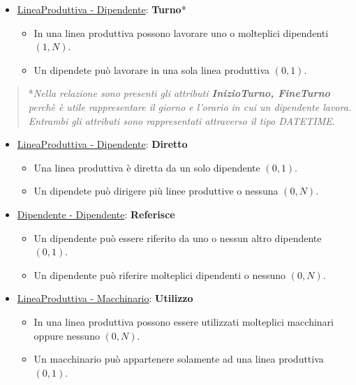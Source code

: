 \begin{itemize}
	\item \underline{LineaProduttiva - Dipendente}: \textbf{Turno}*
	
	\begin{itemize}
		\item In una linea produttiva possono lavorare uno o molteplici dipendenti $(1,N)$.
		\item Un dipendete può lavorare in una sola linea produttiva $(0,1)$.
	\end{itemize}
	
\end{itemize}

\begin{verse}
	*\emph{Nella relazione sono presenti gli attributi \textbf{InizioTurno, FineTurno} perchè è utile rappresentare il giorno e l'orario in cui un dipendente lavora. Entrambi gli attributi sono rappresentati attraverso il tipo DATETIME.}
\end{verse}

\begin{itemize}
	\item \underline{LineaProduttiva - Dipendente}: \textbf{Diretto}
	
	\begin{itemize}
		\item Una linea produttiva è diretta da un solo dipendente $(0,1)$.
		\item Un dipendete può dirigere più linee produttive o nessuna $(0,N)$.
	\end{itemize}
	
\end{itemize}

\begin{itemize}
	\item \underline{Dipendente - Dipendente}: \textbf{Referisce}
	
	\begin{itemize}
		\item Un dipendente può essere riferito da uno o nessun altro dipendente $(0,1)$.
		\item Un dipendente può riferire molteplici dipendenti o nessuno $(0,N)$.
	\end{itemize}
	
\end{itemize}

\begin{itemize}
	\item \underline{LineaProduttiva - Macchinario}: \textbf{Utilizzo}
	
	\begin{itemize}
		\item In una linea produttiva possono essere utilizzati molteplici macchinari oppure nessuno $(0,N)$.
		\item Un macchinario può appartenere solamente ad una linea produttiva $(0,1)$.
	\end{itemize}
	
\end{itemize}

